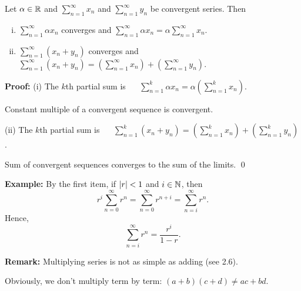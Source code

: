 \documentclass[10pt,aspectratio=169]{beamer}
\begin{document}
\begin{frame}

\begin{proposition}
Let $\alpha \in {\mathbb{R}}$ and $\displaystyle\sum_{n=1}^\infty x_n$ and
$\displaystyle\sum_{n=1}^\infty y_n$ be
convergent series.
\pause
Then
\begin{enumerate}[(i)]
\item
$\displaystyle\sum_{n=1}^\infty \alpha x_n$ converges and \quad
$\displaystyle
\sum_{n=1}^\infty \alpha x_n
=
\alpha \sum_{n=1}^\infty x_n$.
\item\pause
$\displaystyle\sum_{n=1}^\infty ( x_n + y_n )$ converges and \quad
$\displaystyle
\sum_{n=1}^\infty ( x_n + y_n ) 
=
\left( \sum_{n=1}^\infty x_n \right)
+
\left( \sum_{n=1}^\infty y_n \right)$.
\end{enumerate}
\end{proposition}

\pause
\textbf{Proof:}
(i)
The $k$th partial sum is 
~~
$\displaystyle
\sum_{n=1}^k \alpha x_n
=
\alpha \left( \sum_{n=1}^k x_n \right)$.

\pause
\medskip

Constant multiple of a convergent sequence is convergent.

\pause
\medskip

(ii) The $k$th partial sum is
~~
$\displaystyle
\sum_{n=1}^k ( x_n + y_n ) 
=
\left( \sum_{n=1}^k x_n \right)
+
\left( \sum_{n=1}^k y_n \right)$.

\pause
\medskip

Sum of convergent sequences converges to the sum of the limits.
\qed

\end{frame}

\begin{frame}

\textbf{Example:}
By the first item, if $\left\lvert {r} \right\rvert < 1$ and $i \in {\mathbb{N}}$, then
\begin{equation*}
r^i \sum_{n=0}^\infty r^n =
\sum_{n=0}^\infty r^{n+i}
=
\sum_{n=i}^\infty r^n .
\end{equation*}
\pause
Hence,
\begin{equation*}
\sum_{n=i}^\infty r^n = \frac{r^i}{1-r} .
\end{equation*}

\pause
\medskip

\textbf{Remark:}
Multiplying series is not as simple as adding (see 2.6).

\pause
Obviously, we don't multiply term by term:
$(a+b)(c+d) \not= ac+bd$.

\end{frame}
\end{document}
